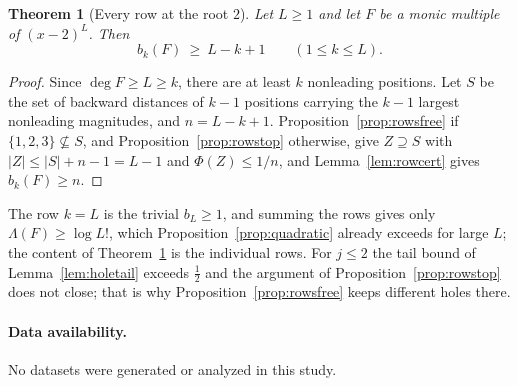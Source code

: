 \documentclass[11pt]{article}
\newtheorem{theorem}{Theorem}[section]
\begin{document}
\begin{theorem}[Every row at the root $2$]\label{thm:everyrow}
Let $L\ge1$ and let $F$ be a monic multiple of $(x-2)^L$.  Then
\[
  b_k(F)\ \ge\ L-k+1\qquad(1\le k\le L).
\]
\end{theorem}

\begin{proof}
Since $\deg F\ge L\ge k$, there are at least $k$ nonleading positions.  Let
$S$ be the set of backward distances of $k-1$ positions carrying the $k-1$
largest nonleading magnitudes, and $n=L-k+1$.  Proposition~\ref{prop:rowsfree}
if $\{1,2,3\}\not\subseteq S$, and Proposition~\ref{prop:rowstop} otherwise,
give $Z\supseteq S$ with $|Z|\le|S|+n-1=L-1$ and $\Phi(Z)\le1/n$, and
Lemma~\ref{lem:rowcert} gives $b_k(F)\ge n$.
\end{proof}

The row $k=L$ is the trivial $b_L\ge1$, and summing the rows gives only
$\Lambda(F)\ge\log L!$, which Proposition~\ref{prop:quadratic} already
exceeds for large $L$; the content of Theorem~\ref{thm:everyrow} is the
individual rows.  For $j\le2$ the tail bound of Lemma~\ref{lem:holetail}
exceeds $\frac12$ and the argument of Proposition~\ref{prop:rowstop} does
not close; that is why Proposition~\ref{prop:rowsfree} keeps different
holes there.

\paragraph{Data availability.}
No datasets were generated or analyzed in this study.
\end{document}
